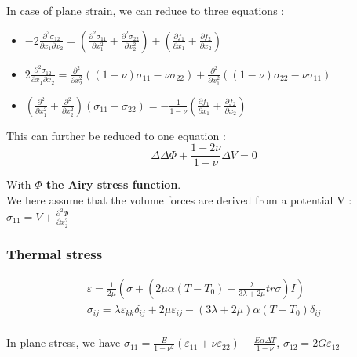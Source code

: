 \documentclass[../main.tex]{subfiles}
\begin{document}
In case of plane strain, we can reduce to three equations : \begin{itemize}
    \item $-2\frac{\partial^2 \sigma_{12}}{\partial x_1 \partial x_2} = (\frac{\partial^2 \sigma_{11}}{\partial x_1^2} + \frac{\partial^2 \sigma_{22}}{\partial x_2^2}) + (\frac{\partial f_1}{\partial x_1} + \frac{\partial f_2}{\partial x_2})$\\
    \item $2\frac{\partial^2 \sigma_{12}}{\partial x_1 \partial x_2} = \frac{\partial^2}{\partial x_2^2} ((1-\nu)\sigma_{11} - \nu \sigma_{22}) + \frac{\partial^2}{\partial x_1^2}((1-\nu)\sigma_{22} - \nu \sigma_{11})$\\
    \item $(\frac{\partial^2}{\partial x_1^2} + \frac{\partial^2}{\partial x_2^2})(\sigma_{11} + \sigma_{22}) = -\frac{1}{1-\nu}(\frac{\partial f_1}{\partial x_1} + \frac{\partial f_2}{\partial x_2})$\\
\end{itemize}

This can further be reduced to one equation : \begin{equation}
    \Delta \Delta \Phi + \frac{1-2\nu}{1-\nu}\Delta V = 0
\end{equation}

With \textbf{$\Phi$ the Airy stress function}.\\

We here assume that the volume forces are derived from a potential V : $\sigma_{11} = V+\frac{\partial^2 \Phi}{\partial x_2^2}$\\

\subsubsection{Thermal stress}
\begin{equation}
    \begin{gathered}
        \varepsilon = \frac{1}{2\mu} (\sigma+ (2\mu \alpha (T-T_0) - \frac{\lambda}{3\lambda + 2\mu} tr\sigma)I)\\
        \sigma_{ij} = \lambda \varepsilon_{kk} \delta_{ij} + 2\mu \varepsilon_{ij} - (3\lambda + 2\mu) \alpha (T-T_0) \delta_{ij}\\
    \end{gathered}
\end{equation}

In plane stress, we have $\sigma_{11} = \frac{E}{1-\nu^2} (\varepsilon_{11}+ \nu \varepsilon_{22}) - \frac{E\alpha \Delta T}{1-\nu}$, $\sigma_{12} = 2G\varepsilon_{12}$\\
\end{document}
